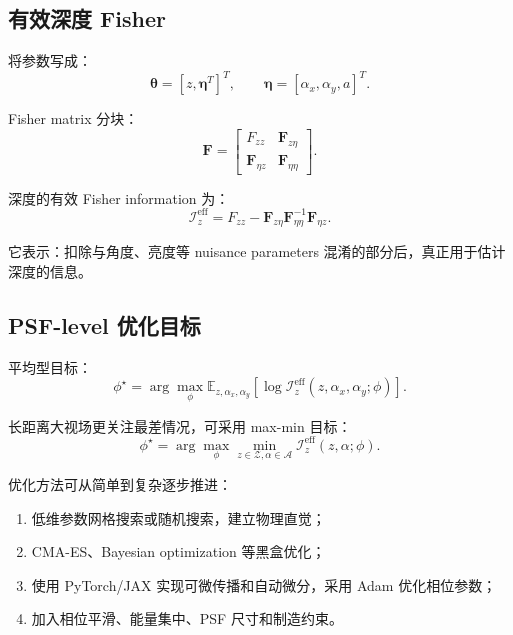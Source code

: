\documentclass[11pt,a4paper,fontset=none]{ctexart}
\begin{document}
\subsection{有效深度 Fisher}

将参数写成：
\begin{equation}
  \bm\theta=[z,\bm\eta^T]^T,
  \qquad
  \bm\eta=[\alpha_x,\alpha_y,a]^T.
\end{equation}

Fisher matrix 分块：
\begin{equation}
  \bm F=
  \begin{bmatrix}
  F_{zz}&\bm F_{z\eta}\\
  \bm F_{\eta z}&\bm F_{\eta\eta}
  \end{bmatrix}.
\end{equation}

深度的有效 Fisher information 为：
\begin{equation}
\boxed{
  \mathcal I_z^{\mathrm{eff}}
  =
  F_{zz}
  -
  \bm F_{z\eta}
  \bm F_{\eta\eta}^{-1}
  \bm F_{\eta z}.
}
\end{equation}

它表示：扣除与角度、亮度等 nuisance parameters 混淆的部分后，真正用于估计深度的信息。

\subsection{PSF-level 优化目标}

平均型目标：
\begin{equation}
  \phi^\star
  =
  \arg\max_\phi
  \mathbb E_{z,\alpha_x,\alpha_y}
  \left[
  \log
  \mathcal I_z^{\mathrm{eff}}(z,\alpha_x,\alpha_y;\phi)
  \right].
\end{equation}

长距离大视场更关注最差情况，可采用 max-min 目标：
\begin{equation}
  \phi^\star
  =
  \arg\max_\phi
  \min_{z\in\mathcal Z,\alpha\in\mathcal A}
  \mathcal I_z^{\mathrm{eff}}(z,\alpha;\phi).
\end{equation}

优化方法可从简单到复杂逐步推进：
\begin{enumerate}
  \item 低维参数网格搜索或随机搜索，建立物理直觉；
  \item CMA-ES、Bayesian optimization 等黑盒优化；
  \item 使用 PyTorch/JAX 实现可微传播和自动微分，采用 Adam 优化相位参数；
  \item 加入相位平滑、能量集中、PSF 尺寸和制造约束。
\end{enumerate}
\end{document}
